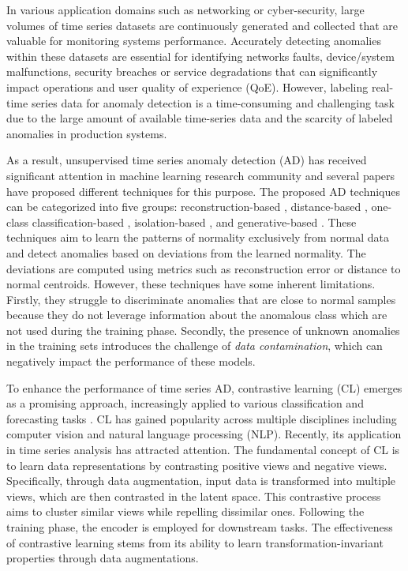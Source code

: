 
In various application domains such as networking or cyber-security, large volumes of time series datasets are continuously generated and collected that are valuable for monitoring systems performance. Accurately detecting anomalies within these datasets are essential for identifying networks faults, device/system malfunctions, security breaches or service degradations that can significantly impact operations and user quality of experience (QoE). However, labeling real-time series data for anomaly detection is a time-consuming and challenging task due to the large amount of available time-series data and the scarcity of labeled anomalies in production systems. 

As a result, unsupervised time series anomaly detection (AD) has received significant attention in machine learning research community and several papers have proposed different techniques for this purpose. 
The proposed AD techniques can be categorized into five groups: reconstruction-based \cite{audibert2020usad, park2018multimodal, su2019robust, xu2018unsupervised}, distance-based \cite{breunig2000lof}, one-class classification-based \cite{pmlr-v80-ruff18a, scholkopf1999support}, isolation-based \cite{liu2008isolation}, and generative-based \cite{Zenati2018AdversariallyLA, zhou2019beatgan}. These techniques aim to learn the patterns of normality exclusively from normal data and detect anomalies based on deviations from the learned normality. The deviations are computed using metrics such as reconstruction error or distance to normal centroids. However, these techniques have some inherent limitations. Firstly, they struggle to discriminate anomalies that are close to normal samples because they do not leverage information about the anomalous class which are not used during the training phase. Secondly, the presence of unknown anomalies in the training sets introduces the challenge of \textit{data contamination}, which can negatively impact the performance of these models.

To enhance the performance of time series AD, contrastive learning (CL) \cite{chopra2005learning}
emerges as a promising approach, increasingly applied to various classification and forecasting tasks \cite{Eldele2021TimeSeriesRL, franceschi2019unsupervised, Yue2021TS2VecTU, Zheng2023SimTSRC}. CL has gained popularity across multiple disciplines including computer vision and natural language processing (NLP). Recently, its application in time series analysis has attracted attention. The fundamental concept of CL is to learn data representations by contrasting positive views and negative views. Specifically, through data augmentation, input data is transformed into multiple views, which are then contrasted in the latent space. This contrastive process aims to cluster similar views while repelling dissimilar ones. Following the training phase, the encoder is employed for downstream tasks. The effectiveness of contrastive learning stems from its ability to learn transformation-invariant properties through data augmentations. 

